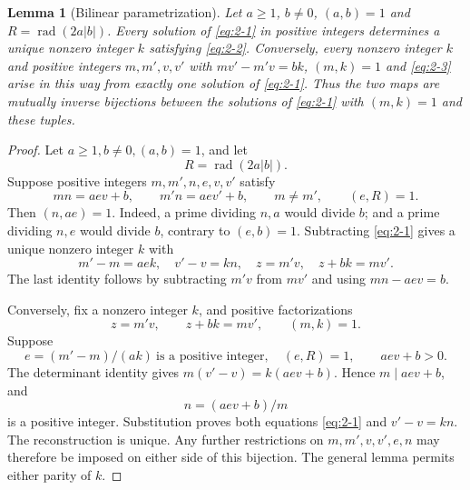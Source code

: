 \documentclass[11pt]{article}
\newtheorem{lemma}[theorem]{Lemma}
\theoremstyle{definition}
\theoremstyle{definition}
\begin{document}
\begin{lemma}[Bilinear parametrization]\label{lem:parametrization}
Let \(a\ge1\), \(b\ne0\), \((a,b)=1\) and \(R=\operatorname{rad}(2a|b|)\). Every solution of \eqref{eq:2-1} in positive integers determines a unique nonzero integer \(k\) satisfying \eqref{eq:2-2}. Conversely, every nonzero integer \(k\) and positive integers \(m,m',v,v'\) with \(mv'-m'v=bk\), \((m,k)=1\) and \eqref{eq:2-3} arise in this way from exactly one solution of \eqref{eq:2-1}. Thus the two maps are mutually inverse bijections between the solutions of \eqref{eq:2-1} with \((m,k)=1\) and these tuples.
\end{lemma}
\begin{proof}
Let \(a\ge1,b\ne0,(a,b)=1\), and let
\begin{equation*}
R=\operatorname{rad}(2a|b|).
\end{equation*}
Suppose positive integers \(m,m',n,e,v,v'\) satisfy
\begin{equation}
mn=aev+b,\qquad m'n=aev'+b,\qquad m\ne m',\qquad(e,R)=1.
                                                        \tag{2.1}\label{eq:2-1}
\end{equation}
Then \((n,ae)=1\). Indeed, a prime dividing \(n,a\) would divide \(b\); and a prime dividing \(n,e\) would divide \(b\), contrary to \((e,b)=1\). Subtracting \eqref{eq:2-1} gives a unique nonzero integer \(k\) with
\begin{equation}
m'-m=aek,\quad v'-v=kn,\quad
 z=m'v,\quad z+bk=mv'.                                 \tag{2.2}\label{eq:2-2}
\end{equation}
The last identity follows by subtracting \(m'v\) from \(mv'\) and using \(mn-aev=b\).

Conversely, fix a nonzero integer \(k\), and positive factorizations
\begin{equation*}
z=m'v,\qquad z+bk=mv',\qquad (m,k)=1.
\end{equation*}
Suppose
\begin{equation}
e=(m'-m)/(ak)\ \text{is a positive integer},\quad(e,R)=1,
 \qquad aev+b>0.                                       \tag{2.3}\label{eq:2-3}
\end{equation}
The determinant identity gives \(m(v'-v)=k(aev+b)\). Hence \(m\mid aev+b\), and
\begin{equation*}
n=(aev+b)/m
\end{equation*}
is a positive integer. Substitution proves both equations \eqref{eq:2-1} and \(v'-v=kn\). The reconstruction is unique. Any further restrictions on \(m,m',v,v',e,n\) may therefore be imposed on either side of this bijection. The general lemma permits either parity of \(k\).

\end{proof}
\end{document}
